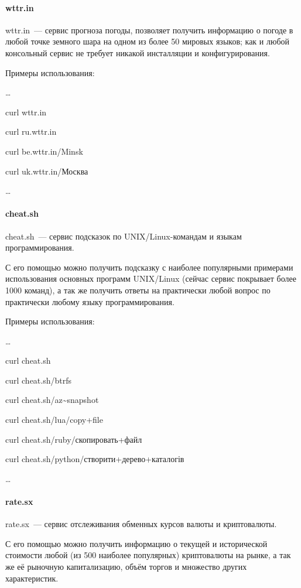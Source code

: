 \documentclass[10pt, a5paper]{article}
\begin{document}
\paragraph{wttr.in}

wttr.in~--- сервис прогноза погоды, позволяет получить информацию о погоде в любой точке земного шара на одном из более 50 мировых языков; как и любой консольный сервис не требует никакой инсталляции и конфигурирования.

Примеры использования:

\ldots

    curl wttr.in

    curl ru.wttr.in

    curl be.wttr.in/Minsk

    curl uk.wttr.in/Москва

\ldots

\paragraph{cheat.sh}

cheat.sh~--- сервис подсказок по UNIX/Linux-командам и языкам программирования.

С его помощью можно получить подсказку с наиболее популярными примерами 
использования основных программ UNIX/Linux (сейчас сервис покрывает более 1000 команд), а так же получить ответы на практически любой вопрос по практически любому языку программирования.

Примеры использования:

\ldots

    curl cheat.sh

    curl cheat.sh/btrfs

    curl cheat.sh/az\~{}snapshot

    curl cheat.sh/lua/copy+file

    curl cheat.sh/ruby/скопировать+файл

    curl cheat.sh/python/створити+дерево+каталогів

\ldots

\paragraph{rate.sx}

rate.sx~--- сервис отслеживания обменных курсов валюты и криптовалюты.

С его помощью можно получить информацию о текущей и исторической стоимости
любой (из 500 наиболее популярных) криптовалюты на рынке, а так же её рыночную капитализацию, объём торгов и множество других характеристик.
\end{document}
